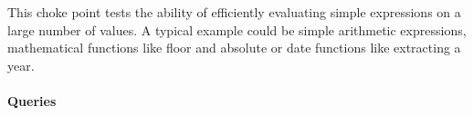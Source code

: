 
This choke point tests the ability of efficiently evaluating simple expressions on a large number of values. A typical example could be simple arithmetic expressions, mathematical functions like floor and absolute or date functions like extracting a year.


\paragraph{Queries}
{\raggedright

}